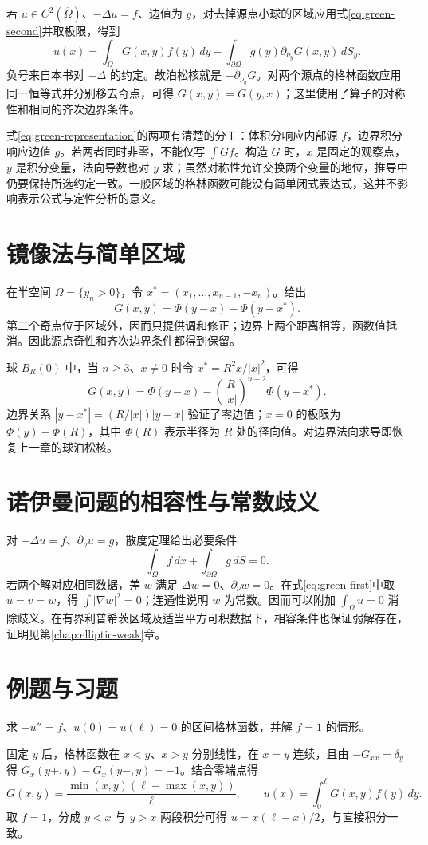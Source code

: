 \documentclass[UTF8,12pt,a4paper,fontset=fandol]{ctexbook}
\begin{document}
若 $u\in C^2(\overline\Omega)$、$-\Delta u=f$、边值为 $g$，对去掉源点小球的区域应用式\eqref{eq:green-second}并取极限，得到
\begin{equation}
 u(x)=\int_\Omega G(x,y)f(y)\,dy-
       \int_{\partial\Omega}g(y)\partial_{\nu_y}G(x,y)\,dS_y.
 \label{eq:green-representation}
\end{equation}
负号来自本书对 $-\Delta$ 的约定。故泊松核就是 $-\partial_{\nu_y}G$。对两个源点的格林函数应用同一恒等式并分别移去奇点，可得 $G(x,y)=G(y,x)$；这里使用了算子的对称性和相同的齐次边界条件。

式\eqref{eq:green-representation}的两项有清楚的分工：体积分响应内部源 $f$，边界积分响应边值 $g$。若两者同时非零，不能仅写 $\int Gf$。构造 $G$ 时，$x$ 是固定的观察点，$y$ 是积分变量，法向导数也对 $y$ 求；虽然对称性允许交换两个变量的地位，推导中仍要保持所选约定一致。一般区域的格林函数可能没有简单闭式表达式，这并不影响表示公式与定性分析的意义。

\section{镜像法与简单区域}
在半空间 $\Omega=\{y_n>0\}$，令 $x^*=(x_1,\ldots,x_{n-1},-x_n)$。给出
\[
 G(x,y)=\Phi(y-x)-\Phi(y-x^*).
\]
第二个奇点位于区域外，因而只提供调和修正；边界上两个距离相等，函数值抵消。因此源点奇性和齐次边界条件都得到保留。

球 $B_R(0)$ 中，当 $n\ge3$、$x\ne0$ 时令 $x^*=R^2x/|x|^2$，可得
\[
 G(x,y)=\Phi(y-x)-\left(\frac R{|x|}\right)^{n-2}\Phi(y-x^*).
\]
边界关系 $|y-x^*|=(R/|x|)|y-x|$ 验证了零边值；$x=0$ 的极限为 $\Phi(y)-\Phi(R)$，其中 $\Phi(R)$ 表示半径为 $R$ 处的径向值。对边界法向求导即恢复上一章的球泊松核。

\section{诺伊曼问题的相容性与常数歧义}
对 $-\Delta u=f$、$\partial_\nu u=g$，散度定理给出必要条件
\begin{equation}
 \int_\Omega f\,dx+\int_{\partial\Omega}g\,dS=0.
 \label{eq:neumann-compatibility}
\end{equation}
若两个解对应相同数据，差 $w$ 满足 $\Delta w=0$、$\partial_\nu w=0$。在式\eqref{eq:green-first}中取 $u=v=w$，得 $\int|\nabla w|^2=0$；连通性说明 $w$ 为常数。因而可以附加 $\int_\Omega u=0$ 消除歧义。在有界利普希茨区域及适当平方可积数据下，相容条件也保证弱解存在，证明见第\ref{chap:elliptic-weak}章。

\section{例题与习题}
\begin{example}
求 $-u''=f$、$u(0)=u(\ell)=0$ 的区间格林函数，并解 $f=1$ 的情形。
\end{example}
\begin{solve}
固定 $y$ 后，格林函数在 $x<y$、$x>y$ 分别线性，在 $x=y$ 连续，且由 $-G_{xx}=\delta_y$ 得 $G_x(y+,y)-G_x(y-,y)=-1$。结合零端点得
\[
 G(x,y)=\frac{\min(x,y)(\ell-\max(x,y))}{\ell},\qquad
 u(x)=\int_0^\ell G(x,y)f(y)\,dy.
\]
取 $f=1$，分成 $y<x$ 与 $y>x$ 两段积分可得 $u=x(\ell-x)/2$，与直接积分一致。
\end{solve}
\end{document}
